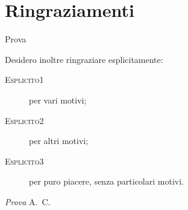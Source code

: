 \cleardoublepage
{}
{}
\chapter*{Ringraziamenti}
Prova

\medskip

Desidero inoltre ringraziare esplicitamente:
\begin{description}
\item[{\scshape Esplicito1}] per vari motivi;
\item[{\scshape Esplicito2}] per altri motivi;
\item[{\scshape Esplicito3}] per puro piacere, senza particolari motivi.
\end{description}

\bigskip
 
\noindent\textit{Prova}
\hfill A.~C.